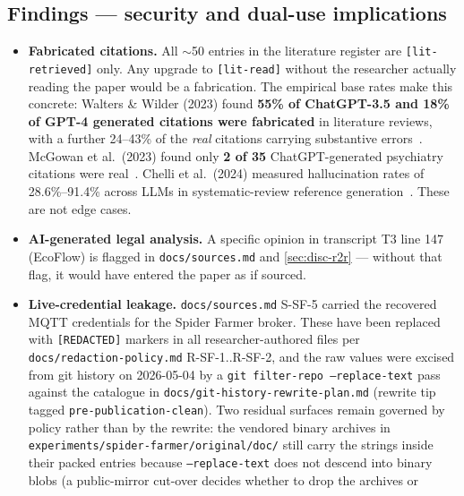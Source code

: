 \documentclass[11pt,a4paper]{article}
\begin{document}
\subsection{Findings --- security and dual-use implications}
\label{sec:meta-security}
\begin{itemize}
  \item \textbf{Fabricated citations.} All $\sim$50 entries in the
        literature register are \texttt{[lit-retrieved]} only. Any upgrade
        to \texttt{[lit-read]} without the researcher actually reading the
        paper would be a fabrication. The empirical base rates make this
        concrete: Walters \& Wilder (2023) found \textbf{55\% of
        ChatGPT-3.5 and 18\% of GPT-4 generated citations were
        fabricated} in literature reviews, with a further 24--43\% of
        the \emph{real} citations carrying substantive
        errors~\citep{walters2023fabricated}. McGowan et al.\ (2023)
        found only \textbf{2 of 35} ChatGPT-generated psychiatry
        citations were real~\citep{mcgowan2023chatgpt}. Chelli et al.\
        (2024) measured hallucination rates of 28.6\%--91.4\% across
        LLMs in systematic-review reference
        generation~\citep{chelli2024hallucination}. These are not edge
        cases.
  \item \textbf{AI-generated legal analysis.} A specific opinion in
        transcript T3 line 147 (EcoFlow) is flagged in
        \texttt{docs/sources.md} and \cref{sec:disc-r2r} --- without that
        flag, it would have entered the paper as if sourced.
  \item \textbf{Live-credential leakage.} \texttt{docs/sources.md} S-SF-5
        carried the recovered MQTT credentials for the Spider Farmer
        broker. These have been replaced with \texttt{[REDACTED]} markers
        in all researcher-authored files per
        \texttt{docs/redaction-policy.md} R-SF-1..R-SF-2, and the raw
        values were excised from git history on 2026-05-04 by a
        \texttt{git filter-repo --replace-text} pass against the
        catalogue in \texttt{docs/git-history-rewrite-plan.md} (rewrite
        tip tagged \texttt{pre-publication-clean}). Two residual
        surfaces remain governed by policy rather than by the rewrite:
        the vendored binary archives in
        \texttt{experiments/spider-farmer/original/doc/} still carry
        the strings inside their packed entries because
        \texttt{--replace-text} does not descend into binary blobs (a
        public-mirror cut-over decides whether to drop the archives or

\end{itemize}
\end{document}
